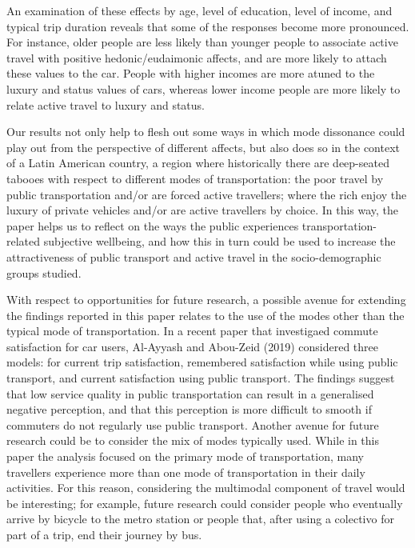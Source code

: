 \documentclass[]{elsarticle} %
\begin{document}
An examination of these effects by age, level of education, level of
income, and typical trip duration reveals that some of the responses
become more pronounced. For instance, older people are less likely than
younger people to associate active travel with positive
hedonic/eudaimonic affects, and are more likely to attach these values
to the car. People with higher incomes are more atuned to the luxury and
status values of cars, whereas lower income people are more likely to
relate active travel to luxury and status.

Our results not only help to flesh out some ways in which mode
dissonance could play out from the perspective of different affects, but
also does so in the context of a Latin American country, a region where
historically there are deep-seated tabooes with respect to different
modes of transportation: the poor travel by public transportation and/or
are forced active travellers; where the rich enjoy the luxury of private
vehicles and/or are active travellers by choice. In this way, the paper
helps us to reflect on the ways the public experiences
transportation-related subjective wellbeing, and how this in turn could
be used to increase the attractiveness of public transport and active
travel in the socio-demographic groups studied.

With respect to opportunities for future research, a possible avenue for
extending the findings reported in this paper relates to the use of the
modes other than the typical mode of transportation. In a recent paper
that investigaed commute satisfaction for car users, Al-Ayyash and
Abou-Zeid (2019) considered three models: for current trip satisfaction,
remembered satisfaction while using public transport, and current
satisfaction using public transport. The findings suggest that low
service quality in public transportation can result in a generalised
negative perception, and that this perception is more difficult to
smooth if commuters do not regularly use public transport. Another
avenue for future research could be to consider the mix of modes
typically used. While in this paper the analysis focused on the primary
mode of transportation, many travellers experience more than one mode of
transportation in their daily activities. For this reason, considering
the multimodal component of travel would be interesting; for example,
future research could consider people who eventually arrive by bicycle
to the metro station or people that, after using a colectivo for part of
a trip, end their journey by bus.
\end{document}

